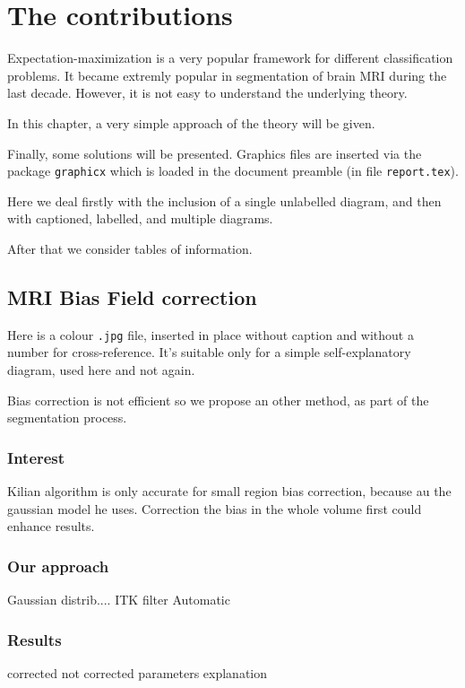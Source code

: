 \chapter{The contributions}\label{sec:contributions}
Expectation-maximization is a very popular framework for different classification problems. It became extremly popular in segmentation of brain MRI during the last decade. However, it is not easy to understand the underlying theory.
\par
In this chapter, a very simple approach of the theory will be given.
\par
\par
Finally, some solutions will be presented.
Graphics files are inserted via the package \texttt{graphicx} which is
loaded in the document preamble (in file \texttt{report.tex}).
\par
Here we deal firstly with the inclusion of a single unlabelled diagram,
and then with captioned, labelled, and multiple diagrams.
\par
After that we consider tables of information.
%
\section{MRI Bias Field correction}
Here is a colour \texttt{.jpg} file, inserted in place without caption
and without a number for cross-reference. It's suitable only for a
simple self-explanatory diagram, used here and not again.

Bias correction is not efficient so we propose an other method, as part of the segmentation process.

\subsection{Interest}

Kilian algorithm is only accurate for small region bias correction, because au the gaussian model he uses.
Correction the bias in the whole volume first could enhance results.

\subsection{Our approach}

Gaussian distrib....
ITK filter
Automatic
\subsection{Results}
corrected not corrected
parameters explanation

